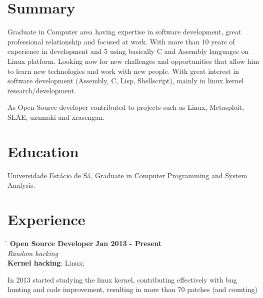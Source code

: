 \documentclass[margin]{res}
\begin{document}

\address{Juazeiro do Norte, CE, Brazil \\
  \href{mailto:geyslan@gmail.com}{geyslan@gmail.com} \\ Phone: 55 88 99617 0441}


\begin{resume}

  \section{Summary} Graduate in Computer area having expertise in software
  development, great professional relationship and focused at work.
  With more than 10 years of experience in development and 5 using
  basically C and Assembly languages on Linux platform. Looking now
  for new challenges and opportunities that allow him to learn new
  technologies and work with new people. With great interest in
  software development (Assembly, C, Lisp, Shellscript), mainly in
  linux kernel research/development.

  As Open Source developer contributed to projects such as Linux,
  Metasploit, SLAE, uzumaki and xrasengan.

  \section{Education} Universidade Estácio de Sá, Graduate in Computer
  Programming and System Analysis.

\section{Experience}

\vspace{-0.1in}
\begin{tabbing}
  \hspace{2.3in}\= \hspace{1.7in}\= \kill %
  \textbf{Open Source Developer}    \>\>\textbf{Jan 2013 - Present}\\
  \textit{Random hacking}\\
  \textbf{Kernel hacking}: Linux;
\end{tabbing}\vspace{-20pt}      %
\vspace{2mm} In 2013 started studying the linux kernel, contributing
effectively with bug hunting and code improvement, resulting in more
than 70 patches (and counting)


\end{resume}
\end{document}
